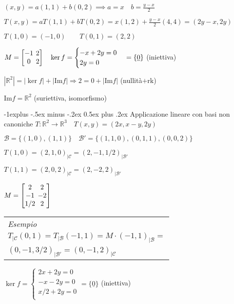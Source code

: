 \documentclass[10pt,landscape]{article}
\makeatletter
\renewcommand{\subsection}{\@startsection{subsection}{2}{0mm}%
                                {-1explus -.5ex minus -.2ex}%
                                {0.5ex plus .2ex}%
                                {\normalfont\normalsize\bfseries}}
\renewcommand{\vec}[1]{\underline{#1}}
\newcommand{\rk}{\mathrm{rk}}
\newcommand{\Imm}{\mathrm{Im}}
\newcommand{\Base}{\mathcal{B}}
\newcommand{\Case}{\mathcal{C}}
\makeatother
\begin{document}
\begin{multicols}{3}
$(x,y) = a(1,1) + b(0,2) \implies a = x \quad b = \frac{y-x}{2}$

$T(x,y) = aT(1,1) + bT(0,2) = x(1,2) + \frac{y-x}{2}(4,4) = (2y-x, 2y)$

$T(1,0) = (-1,0) \qquad T(0,1) = (2,2)$

$M = \left[
	\arraycolsep=2.0pt\def\arraystretch{1.0}
	\begin{array}{@{}cc@{}}
		-1 & 2 \\
		0 & 2 \\
	\end{array}
\right]
\quad
\ker f = \begin{cases}
	-x +2y = 0 \\
	2y = 0 \\
\end{cases}
= \{\vec{0}\}
$ (iniettiva)

$|\mathbb{R}^2| = |\ker f| + |\Imm f| \Rightarrow 2 = 0 + |\Imm f|$ (nullità$+\rk$)

$\Imm f = \mathbb{R}^2$ (suriettiva, isomorfismo)

\subsection{Applicazione lineare con basi non canoniche}
$T: \mathbb{R}^2 \rightarrow \mathbb{R}^3 \quad T(x,y) = (2x, x-y, 2y)$

$\Base=\{(1,0), (1,1)\} \quad \Base'=\{(1,1,0),(0,1,1),(0,0,2)\}$

$T(1,0) = (2, 1, 0)_{|\Case} = (2, -1, 1/2)_{|\Base'}$

$T(1,1) = (2, 0, 2)_{|\Case} = (2, -2, 2)_{|\Base'}$

$
M = \left[
	\arraycolsep=2.0pt\def\arraystretch{1.0}
	\begin{array}{@{}cc@{}}
		2 & 2 \\
		-1 & -2 \\
		1/2 & 2 \\
	\end{array}
\right]
$
\begin{tabular}{l}
	\emph{Esempio} \\
	$T_{|\Case}(0,1) = T_{|\Base}(-1,1) = M \cdot (-1,1)_{|\Base} =$ \\
	$(0,-1,3/2)_{|\Base'} = (0,-1,2)_{|\Case}$ \\
\end{tabular}

$\ker f = \begin{cases}
2x+2y = 0 \\[-0.3em]
-x-2y = 0 \\[-0.3em]
x/2+2y = 0 \\
\end{cases} = \{\vec{0}\}$ (iniettiva)


\end{multicols}
\end{document}
